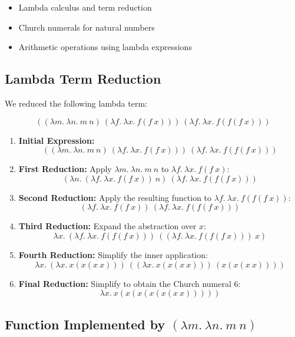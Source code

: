 \documentclass{article}
\begin{document}
\begin{itemize}
    \item Lambda calculus and term reduction
    \item Church numerals for natural numbers
    \item Arithmetic operations using lambda expressions
\end{itemize}

\subsection*{Lambda Term Reduction}

We reduced the following lambda term:

\[
((\lambda m.\ \lambda n.\ m\ n)\ (\lambda f.\ \lambda x.\ f(f\ x)))\ (\lambda f.\ \lambda x.\ f(f(f\ x)))
\]

\begin{enumerate}
    \item \textbf{Initial Expression:}
    \[
    ((\lambda m.\ \lambda n.\ m\ n)\ (\lambda f.\ \lambda x.\ f(f\ x)))\ (\lambda f.\ \lambda x.\ f(f(f\ x)))
    \]

    \item \textbf{First Reduction:} Apply \(\lambda m.\ \lambda n.\ m\ n\) to \(\lambda f.\ \lambda x.\ f(f\ x)\):
    \[
    (\lambda n.\ (\lambda f.\ \lambda x.\ f(f\ x))\ n)\ (\lambda f.\ \lambda x.\ f(f(f\ x)))
    \]

    \item \textbf{Second Reduction:} Apply the resulting function to \(\lambda f.\ \lambda x.\ f(f(f\ x))\):
    \[
    (\lambda f.\ \lambda x.\ f(f\ x))\ (\lambda f.\ \lambda x.\ f(f(f\ x)))
    \]

    \item \textbf{Third Reduction:} Expand the abstraction over \(x\):
    \[
    \lambda x.\ (\lambda f.\ \lambda x.\ f(f(f\ x)))\ ((\lambda f.\ \lambda x.\ f(f(f\ x)))\ x)
    \]

    \item \textbf{Fourth Reduction:} Simplify the inner application:
    \[
    \lambda x.\ (\lambda x.\ x(x(x\ x)))\ ((\lambda x.\ x(x(x\ x)))\ (x(x(x\ x))))
    \]

    \item \textbf{Final Reduction:} Simplify to obtain the Church numeral 6:
    \[
    \lambda x.\ x(x(x(x(x(x\ x)))))
    \]
\end{enumerate}

\subsection*{Function Implemented by \((\lambda m.\ \lambda n.\ m\ n)\)}
\end{document}
